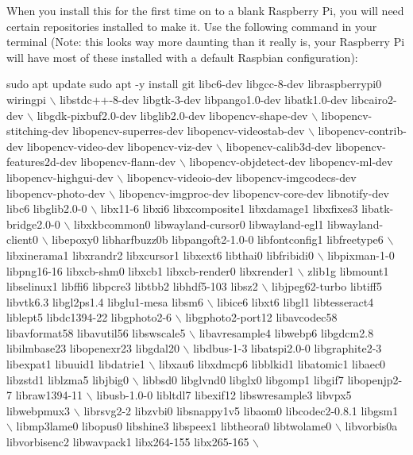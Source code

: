 When you install this for the first time on to a \textquotesingle{}blank\textquotesingle{} Raspberry Pi, you will need certain repositories installed to make it. Use the following command in your terminal (Note\+: this looks way more daunting than it really is, your Raspberry Pi will have most of these installed with a default Raspbian configuration)\+:


\begin{DoxyCode}
sudo apt update
sudo apt -y install git libc6-dev libgcc-8-dev libraspberrypi0 wiringpi \(\backslash\)
libstdc++-8-dev libgtk-3-dev libpango1.0-dev libatk1.0-dev libcairo2-dev \(\backslash\)
libgdk-pixbuf2.0-dev libglib2.0-dev libopencv-shape-dev \(\backslash\)
libopencv-stitching-dev libopencv-superres-dev libopencv-videostab-dev \(\backslash\)
libopencv-contrib-dev libopencv-video-dev libopencv-viz-dev \(\backslash\)
libopencv-calib3d-dev libopencv-features2d-dev libopencv-flann-dev \(\backslash\)
libopencv-objdetect-dev libopencv-ml-dev libopencv-highgui-dev \(\backslash\)
libopencv-videoio-dev libopencv-imgcodecs-dev libopencv-photo-dev \(\backslash\)
libopencv-imgproc-dev libopencv-core-dev libnotify-dev libc6 libglib2.0-0 \(\backslash\)
libx11-6 libxi6 libxcomposite1 libxdamage1 libxfixes3 libatk-bridge2.0-0 \(\backslash\)
libxkbcommon0 libwayland-cursor0 libwayland-egl1 libwayland-client0 \(\backslash\)
libepoxy0 libharfbuzz0b libpangoft2-1.0-0 libfontconfig1 libfreetype6 \(\backslash\)
libxinerama1 libxrandr2 libxcursor1 libxext6 libthai0 libfribidi0 \(\backslash\)
libpixman-1-0 libpng16-16 libxcb-shm0 libxcb1 libxcb-render0 libxrender1 \(\backslash\)
zlib1g libmount1 libselinux1 libffi6 libpcre3 libtbb2 libhdf5-103 libsz2 \(\backslash\)
libjpeg62-turbo libtiff5 libvtk6.3 libgl2ps1.4 libglu1-mesa libsm6 \(\backslash\)
libice6 libxt6 libgl1 libtesseract4 liblept5 libdc1394-22 libgphoto2-6 \(\backslash\)
libgphoto2-port12 libavcodec58 libavformat58 libavutil56 libswscale5 \(\backslash\)
libavresample4 libwebp6 libgdcm2.8 libilmbase23 libopenexr23 libgdal20 \(\backslash\)
libdbus-1-3 libatspi2.0-0 libgraphite2-3 libexpat1 libuuid1 libdatrie1 \(\backslash\)
libxau6 libxdmcp6 libblkid1 libatomic1 libaec0 libzstd1 liblzma5 libjbig0 \(\backslash\)
libbsd0 libglvnd0 libglx0 libgomp1 libgif7 libopenjp2-7 libraw1394-11 \(\backslash\)
libusb-1.0-0 libltdl7 libexif12 libswresample3 libvpx5 libwebpmux3 \(\backslash\)
librsvg2-2 libzvbi0 libsnappy1v5 libaom0 libcodec2-0.8.1 libgsm1 \(\backslash\)
libmp3lame0 libopus0 libshine3 libspeex1 libtheora0 libtwolame0 \(\backslash\)
libvorbis0a libvorbisenc2 libwavpack1 libx264-155 libx265-165 \(\backslash\)

\end{DoxyCode}
